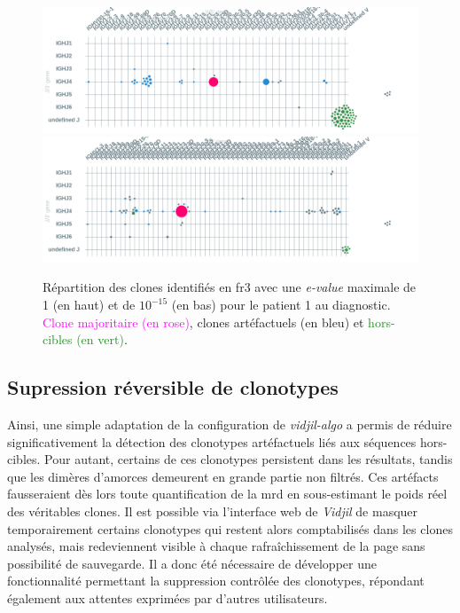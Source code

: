 \begin{figure}[H]
    \centering
    \includegraphics[width=1\textwidth]{images/diah_fr3_e1.png}
    \vspace{0.5cm}
    \includegraphics[width=1\textwidth]{images/diag_fr3_e-15.png}
    \caption{
        Répartition des clones identifiés en \gls{fr}3 avec une \textit{e-value} maximale de 1 (en haut)
        et de $10^{-15}$ (en bas) pour le patient 1 au diagnostic. \textcolor{Magenta}{Clone majoritaire (en rose)},
        \textcolor{ProcessBlue}{clones artéfactuels (en bleu)} et \textcolor{ForestGreen}{hors-cibles (en vert)}.
    }
    \label{fig:fr3-evalue}
\end{figure}

\subsection{Supression réversible de clonotypes}

Ainsi, une simple adaptation de la configuration de \textit{vidjil-algo} a
permis de réduire significativement la détection des clonotypes artéfactuels
liés aux séquences hors-cibles. Pour autant, certains de ces clonotypes
persistent dans les résultats, tandis que les dimères d'amorces demeurent en
grande partie non filtrés. Ces artéfacts fausseraient dès lors toute
quantification de la \gls{mrd} en sous-estimant le poids réel des véritables
clones. Il est possible via l'interface web de \textit{Vidjil} de masquer
temporairement certains clonotypes qui restent alors comptabilisés dans les
clones analysés, mais redeviennent visible à chaque rafraîchissement de la page
sans possibilité de sauvegarde. Il a donc été nécessaire de développer une
fonctionnalité permettant la suppression contrôlée des clonotypes, répondant
également aux attentes exprimées par d'autres utilisateurs.

